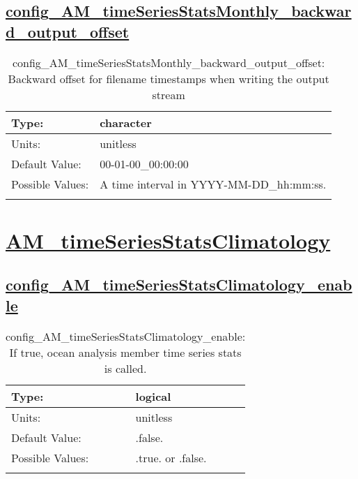 \subsection[config\_AM\_timeSeriesStatsMonthly\_backward\_output\_offset]{\hyperref[sec:nm_tab_AM_timeSeriesStatsMonthly]{config\_AM\_timeSeriesStatsMonthly\_backward\_output\_offset}}
\label{subsec:nm_sec_config_AM_timeSeriesStatsMonthly_backward_output_offset}
\begin{center}
\begin{longtable}{| p{2.0in} || p{4.0in} |}
    \hline
    Type: & character \\
    \hline
    Units: & \si{unitless} \\
    \hline
    Default Value: & 00-01-00\_00:00:00 \\
    \hline
    Possible Values: & A time interval in YYYY-MM-DD\_hh:mm:ss. \\
    \hline
    \caption{config\_AM\_timeSeriesStatsMonthly\_backward\_output\_offset: Backward offset for filename timestamps when writing the output stream}
\end{longtable}
\end{center}
\section[AM\_timeSeriesStatsClimatology]{\hyperref[sec:nm_tab_AM_timeSeriesStatsClimatology]{AM\_timeSeriesStatsClimatology}}
\label{sec:nm_sec_AM_timeSeriesStatsClimatology}
\subsection[config\_AM\_timeSeriesStatsClimatology\_enable]{\hyperref[sec:nm_tab_AM_timeSeriesStatsClimatology]{config\_AM\_timeSeriesStatsClimatology\_enable}}
\label{subsec:nm_sec_config_AM_timeSeriesStatsClimatology_enable}
\begin{center}
\begin{longtable}{| p{2.0in} || p{4.0in} |}
    \hline
    Type: & logical \\
    \hline
    Units: & \si{unitless} \\
    \hline
    Default Value: & .false. \\
    \hline
    Possible Values: & .true. or .false. \\
    \hline
    \caption{config\_AM\_timeSeriesStatsClimatology\_enable: If true, ocean analysis member time series stats is called.}
\end{longtable}
\end{center}
